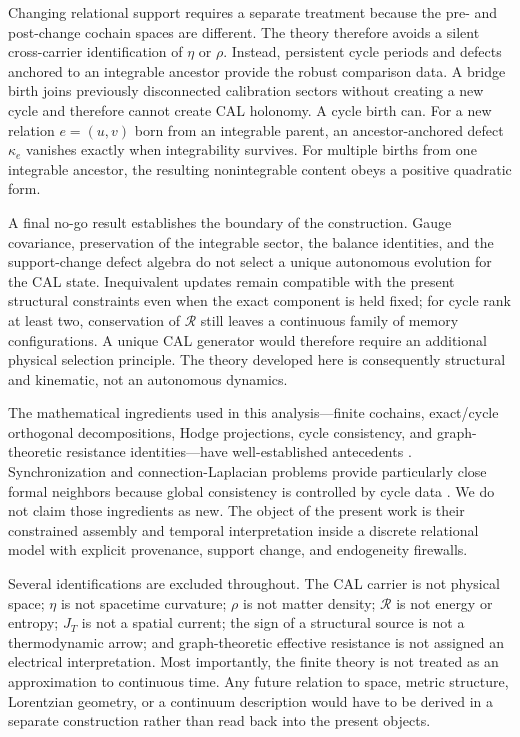 \documentclass[aip,jmp,amsmath,amssymb,reprint]{revtex4-2}
\newcommand{\Rcal}{\mathcal{R}}
\begin{document}
Changing relational support requires a separate treatment because the pre- and post-change cochain spaces are different. The theory therefore avoids a silent cross-carrier identification of $\eta$ or $\rho$. Instead, persistent cycle periods and defects anchored to an integrable ancestor provide the robust comparison data. A bridge birth joins previously disconnected calibration sectors without creating a new cycle and therefore cannot create CAL holonomy. A cycle birth can. For a new relation $e=(u,v)$ born from an integrable parent, an ancestor-anchored defect $\kappa_e$ vanishes exactly when integrability survives. For multiple births from one integrable ancestor, the resulting nonintegrable content obeys a positive quadratic form.

A final no-go result establishes the boundary of the construction. Gauge covariance, preservation of the integrable sector, the balance identities, and the support-change defect algebra do not select a unique autonomous evolution for the CAL state. Inequivalent updates remain compatible with the present structural constraints even when the exact component is held fixed; for cycle rank at least two, conservation of $\Rcal$ still leaves a continuous family of memory configurations. A unique CAL generator would therefore require an additional physical selection principle. The theory developed here is consequently structural and kinematic, not an autonomous dynamics.

The mathematical ingredients used in this analysis---finite cochains, exact/cycle orthogonal decompositions, Hodge projections, cycle consistency, and graph-theoretic resistance identities---have well-established antecedents \cite{Whitney1957,Desbrun2005DEC,Jiang2011HodgeRank,Lim2020HodgeLaplacians}. Synchronization and connection-Laplacian problems provide particularly close formal neighbors because global consistency is controlled by cycle data \cite{Singer2011Synchronization,Bandeira2013ConnectionLaplacian}. We do not claim those ingredients as new. The object of the present work is their constrained assembly and temporal interpretation inside a discrete relational model with explicit provenance, support change, and endogeneity firewalls.

Several identifications are excluded throughout. The CAL carrier is not physical space; $\eta$ is not spacetime curvature; $\rho$ is not matter density; $\Rcal$ is not energy or entropy; $J_T$ is not a spatial current; the sign of a structural source is not a thermodynamic arrow; and graph-theoretic effective resistance is not assigned an electrical interpretation. Most importantly, the finite theory is not treated as an approximation to continuous time. Any future relation to space, metric structure, Lorentzian geometry, or a continuum description would have to be derived in a separate construction rather than read back into the present objects.
\end{document}
